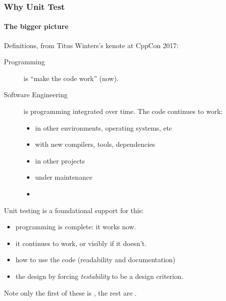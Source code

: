 \begin{frame}[fragile]
\frametitle{Why Unit Test}
\framesubtitle{The bigger picture}
Definitions, from Titus Winters's kenote at CppCon 2017: 
\begin{description}
\item [Programming] is ``make the code work'' (now).
\item [Software Engineering] is programming integrated over time.  The
  code continues to work:
\begin{itemize}
\item in other environments, operating systems, etc
\item with new compilers, tools, dependencies
\item in other projects
\item under maintenance
\item {}
\end{itemize}
\end{description}

Unit testing is a foundational support for this:
\begin{itemize}
\item {} programming is complete: it works now.
\item {} it continues to work, or  visibly if it
  doesn't.
\item {} how to use the code (readability and documentation)
\item {} the design by forcing \emph{testability} to be a
  design criterion.

\end{itemize}

Note only the first of these is , the rest are .

\end{frame}


